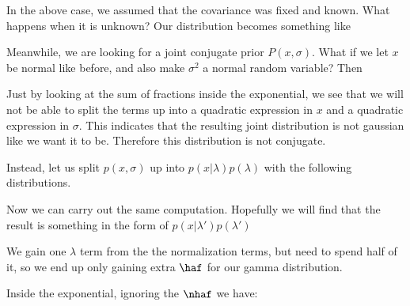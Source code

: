 \documentclass[12pt]{article}
\begin{document}
In the above case, we assumed that the covariance was fixed and known. What happens when it is unknown? Our distribution becomes something like


Meanwhile, we are looking for a joint conjugate prior $P(x, \sigma)$. What if we let $x$ be normal like before, and also make $\sigma^2$ a normal random variable? Then


Just by looking at the sum of fractions inside the exponential, we see that we will not be able to split the terms up into a quadratic expression in $x$ and a quadratic expression in $\sigma$. This indicates that the resulting joint distribution is not gaussian like we want it to be. Therefore this distribution is not conjugate.

Instead, let us split $p(x, \sigma)$ up into $p(x|\lambda)p(\lambda)$ with the following distributions.


Now we can carry out the same computation. Hopefully we will find that the result is something in the form of $p(x|\lambda')p(\lambda')$


We gain one $\lambda$ term from the the normalization terms, but need to spend half of it, so we end up only gaining extra $\haf$ for our gamma distribution.


Inside the exponential, ignoring the $\nhaf$ we have:

\end{document}
